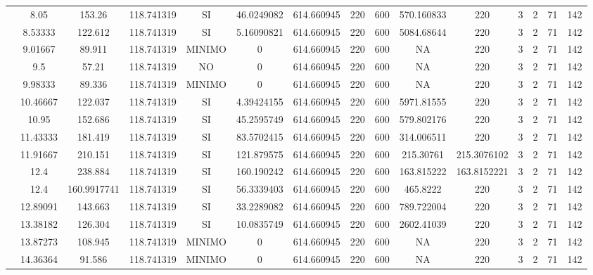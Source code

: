 \begin{table}[H]
{\begin{tabular}{|c|c|c|c|c|c|c|c|c|c|c|c|c|c|c|}
\cline{2-15}    & 8.05 & 153.26 & 118.741319 & SI  & 46.0249082 & 614.660945 & 220 & 600 & 570.160833 & 220 & 3   & 2   & 71  & 142 \bigstrut\\
\cline{2-15}    & 8.53333 & 122.612 & 118.741319 & SI  & 5.16090821 & 614.660945 & 220 & 600 & 5084.68644 & 220 & 3   & 2   & 71  & 142 \bigstrut\\
\cline{2-15}    & 9.01667 & 89.911 & 118.741319 & MINIMO & 0   & 614.660945 & 220 & 600 & NA  & 220 & 3   & 2   & 71  & 142 \bigstrut\\
\cline{2-15}    & 9.5 & 57.21 & 118.741319 & NO  & 0   & 614.660945 & 220 & 600 & NA  & 220 & 3   & 2   & 71  & 142 \bigstrut\\
\cline{2-15}    & 9.98333 & 89.336 & 118.741319 & MINIMO & 0   & 614.660945 & 220 & 600 & NA  & 220 & 3   & 2   & 71  & 142 \bigstrut\\
\cline{2-15}    & 10.46667 & 122.037 & 118.741319 & SI  & 4.39424155 & 614.660945 & 220 & 600 & 5971.81555 & 220 & 3   & 2   & 71  & 142 \bigstrut\\
\cline{2-15}    & 10.95 & 152.686 & 118.741319 & SI  & 45.2595749 & 614.660945 & 220 & 600 & 579.802176 & 220 & 3   & 2   & 71  & 142 \bigstrut\\
\cline{2-15}    & 11.43333 & 181.419 & 118.741319 & SI  & 83.5702415 & 614.660945 & 220 & 600 & 314.006511 & 220 & 3   & 2   & 71  & 142 \bigstrut\\
\cline{2-15}    & 11.91667 & 210.151 & 118.741319 & SI  & 121.879575 & 614.660945 & 220 & 600 & 215.30761 & 215.3076102 & 3   & 2   & 71  & 142 \bigstrut\\
\cline{2-15}    & 12.4 & 238.884 & 118.741319 & SI  & 160.190242 & 614.660945 & 220 & 600 & 163.815222 & 163.8152221 & 3   & 2   & 71  & 142 \bigstrut\\
\cline{2-15}    & 12.4 & 160.9917741 & 118.741319 & SI  & 56.3339403 & 614.660945 & 220 & 600 & 465.8222 & 220 & 3   & 2   & 71  & 142 \bigstrut\\
\cline{2-15}    & 12.89091 & 143.663 & 118.741319 & SI  & 33.2289082 & 614.660945 & 220 & 600 & 789.722004 & 220 & 3   & 2   & 71  & 142 \bigstrut\\
\cline{2-15}    & 13.38182 & 126.304 & 118.741319 & SI  & 10.0835749 & 614.660945 & 220 & 600 & 2602.41039 & 220 & 3   & 2   & 71  & 142 \bigstrut\\
\cline{2-15}    & 13.87273 & 108.945 & 118.741319 & MINIMO & 0   & 614.660945 & 220 & 600 & NA  & 220 & 3   & 2   & 71  & 142 \bigstrut\\
\cline{2-15}    & 14.36364 & 91.586 & 118.741319 & MINIMO & 0   & 614.660945 & 220 & 600 & NA  & 220 & 3   & 2   & 71  & 142 \bigstrut\\

\end{tabular}}
\end{table}
